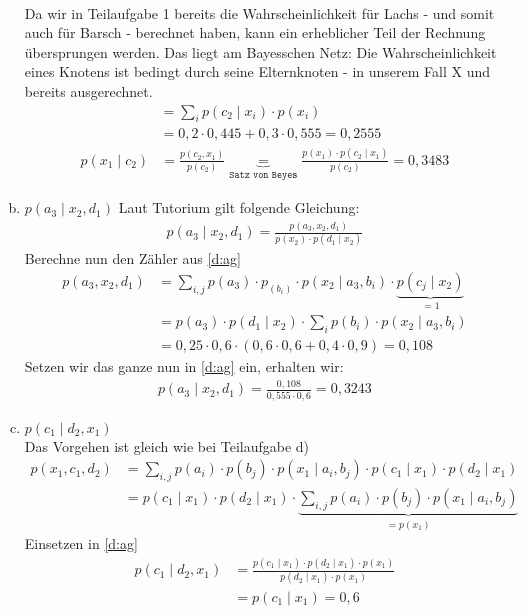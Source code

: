 \begin{enumerate}[a)]
\begin{align*}
	\end{align*}
	Da wir in Teilaufgabe 1 bereits die Wahrscheinlichkeit für Lachs - und somit auch für Barsch - berechnet haben, kann ein erheblicher Teil der Rechnung übersprungen werden. Das liegt am Bayesschen Netz: Die Wahrscheinlichkeit eines Knotens ist bedingt durch seine Elternknoten - in unserem Fall X und bereits ausgerechnet.
	\begin{align*}
		&= \sum_{i} p(c_2\mid x_i)  \cdot p(x_i)\\
		&= 0,2\cdot 0,445 + 0,3 \cdot 0,555 = 0,2555 
	\end{align*}
	\begin{align*}
		p(x_1\mid c_2) &= \frac{p(c_2,x_1)}{p(c_2)}\underbrace{=}_{\texttt{Satz von Beyes}} \frac{p(x_1)\cdot p(c_2\mid x_1)}{p(c_2)} = 0,3483
	\end{align*}
	\item $p(a_3\mid x_2,d_1)$
	Laut Tutorium gilt folgende Gleichung:
	\begin{align}
		p(a_3\mid x_2,d_1) = \frac{p(a_3,x_2,d_1)}{p(x_2)\cdot p(d_1\mid x_2)}\label{d:ag}
	\end{align}
	Berechne nun den Zähler aus \ref{d:ag}
	\begin{align*}
	p(a_3,x_2,d_1) &= \sum_{i,j} p(a_3)\cdot p_(b_i) \cdot p(x_2\mid a_3,b_i) \cdot \underbrace{p(c_j\mid x_2)}_{=1}\\
	&= p(a_3) \cdot p(d_1\mid x_2) \cdot \sum_{i} p(b_i) \cdot p(x_2\mid a_3,b_i)\\
	&= 0,25 \cdot 0,6 \cdot (0,6\cdot 0,6 + 0,4 \cdot 0,9) = 0,108
	\end{align*}
	Setzen wir das ganze nun in \ref{d:ag} ein, erhalten wir:
	\begin{align*}
		p(a_3\mid x_2,d_1) = \frac{0,108}{0,555\cdot 0,6} = 0,3243
	\end{align*}
	\item $p(c_1\mid d_2,x_1)$\\
	Das Vorgehen ist gleich wie bei Teilaufgabe d)
	\begin{align*}
		p(x_1,c_1,d_2) &= \sum_{i,j} p(a_i)\cdot p(b_j) \cdot p(x_1\mid a_i,b_j) \cdot p(c_1\mid x_1)\cdot p(d_2\mid x_1)\\
		&=p(c_1\mid x_1)\cdot p(d_2\mid x_1) \cdot \underbrace{\sum_{i,j} p(a_i) \cdot p(b_j) \cdot p(x_1\mid a_i,b_j)}_{=p(x_1)}
	\end{align*}
	Einsetzen in \ref{d:ag}
	\begin{align*}
	p(c_1\mid d_2,x_1) &= \frac{p(c_1\mid x_1)\cdot p(d_2\mid x_1)\cdot p(x_1)}{p(d_2\mid x_1)\cdot p(x_1)}\\
	&= p(c_1\mid x_1) = 0,6
	\end{align*}
	
\end{enumerate}
